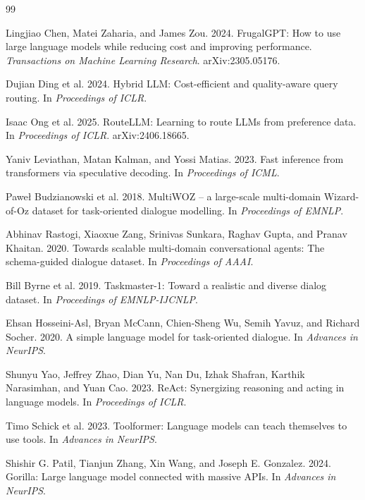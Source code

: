 \documentclass[11pt,a4paper]{article}
\begin{document}
\begin{thebibliography}{99}
\small
\setlength{\itemsep}{0pt}

 Lingjiao Chen, Matei Zaharia, and James Zou. 2024. FrugalGPT: How to use large language models
while reducing cost and improving performance. \emph{Transactions on Machine Learning Research}. arXiv:2305.05176.

 Dujian Ding et al. 2024. Hybrid LLM: Cost-efficient and quality-aware query routing. In
\emph{Proceedings of ICLR}.

 Isaac Ong et al. 2025. RouteLLM: Learning to route LLMs from preference data. In \emph{Proceedings
of ICLR}. arXiv:2406.18665.

 Yaniv Leviathan, Matan Kalman, and Yossi Matias. 2023. Fast inference from transformers via
speculative decoding. In \emph{Proceedings of ICML}.

 Pawe{\l} Budzianowski et al. 2018. MultiWOZ -- a large-scale multi-domain Wizard-of-Oz dataset for
task-oriented dialogue modelling. In \emph{Proceedings of EMNLP}.

 Abhinav Rastogi, Xiaoxue Zang, Srinivas Sunkara, Raghav Gupta, and Pranav Khaitan. 2020. Towards
scalable multi-domain conversational agents: The schema-guided dialogue dataset. In \emph{Proceedings of AAAI}.

 Bill Byrne et al. 2019. Taskmaster-1: Toward a realistic and diverse dialog dataset. In
\emph{Proceedings of EMNLP-IJCNLP}.

 Ehsan Hosseini-Asl, Bryan McCann, Chien-Sheng Wu, Semih Yavuz, and Richard Socher. 2020. A simple
language model for task-oriented dialogue. In \emph{Advances in NeurIPS}.

 Shunyu Yao, Jeffrey Zhao, Dian Yu, Nan Du, Izhak Shafran, Karthik Narasimhan, and Yuan Cao. 2023.
ReAct: Synergizing reasoning and acting in language models. In \emph{Proceedings of ICLR}.

 Timo Schick et al. 2023. Toolformer: Language models can teach themselves to use tools. In
\emph{Advances in NeurIPS}.

 Shishir G. Patil, Tianjun Zhang, Xin Wang, and Joseph E. Gonzalez. 2024. Gorilla: Large language
model connected with massive APIs. In \emph{Advances in NeurIPS}.


\end{thebibliography}
\end{document}

